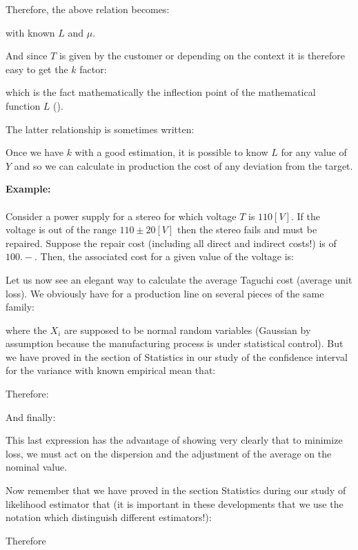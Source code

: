	Therefore, the above relation becomes:
	
	with known $L$ and $\mu$.
	
	And since $T$ is given by the customer or depending on the context it is therefore easy to get the $k$ factor:
	
	which is the fact mathematically the inflection point of the mathematical function $L$ ().
	
	The latter relationship is sometimes written:
	
	
	Once we have $k$ with a good estimation, it is possible to know $L$ for any value of $Y$ and so we can calculate in production the cost of any deviation from the target.
	
	\begin{tcolorbox}[colframe=black,colback=white,sharp corners]
	\textbf{{\Large {}}Example:}\\\\
	Consider a power supply for a stereo for which voltage $T$ is $110 [V]$. If the voltage is out of the range $110\pm 20 [V]$ then the stereo fails and must be repaired. Suppose the repair cost (including all direct and indirect costs!) is of $100.-$. Then, the associated cost for a given value of the voltage is:
	
	\end{tcolorbox}
	
	Let us now see an elegant way to calculate the average Taguchi cost (average unit loss). We obviously have for a production line on several pieces of the same family:
	
	where the $X_i$ are supposed to be normal random variables (Gaussian by  assumption because the manufacturing process is under statistical control). But we have proved in the section of Statistics in our study of the confidence interval for the variance with known empirical mean that:
	
	Therefore:
	
	And finally:
	
	This last expression has the advantage of showing very clearly that to minimize loss, we must act on the dispersion and the adjustment of the average on the nominal value.
	
	Now remember that we have proved in the section Statistics during our study of likelihood estimator that (it is important in these developments that we use the notation which distinguish different estimators!):
	
	Therefore
	
